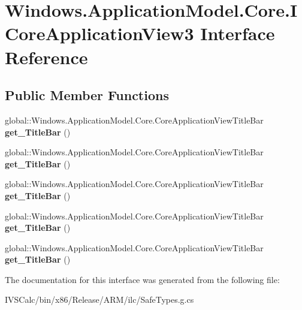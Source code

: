 \hypertarget{interface_windows_1_1_application_model_1_1_core_1_1_i_core_application_view3}{}\section{Windows.\+Application\+Model.\+Core.\+I\+Core\+Application\+View3 Interface Reference}
\label{interface_windows_1_1_application_model_1_1_core_1_1_i_core_application_view3}
\subsection*{Public Member Functions}
\begin{DoxyCompactItemize}
\item 
\mbox{\label{interface_windows_1_1_application_model_1_1_core_1_1_i_core_application_view3_adbb5333a4da014037cde0f6090433caf}} 
global\+::\+Windows.\+Application\+Model.\+Core.\+Core\+Application\+View\+Title\+Bar {\bfseries get\+\_\+\+Title\+Bar} ()
\item 
\mbox{\label{interface_windows_1_1_application_model_1_1_core_1_1_i_core_application_view3_adbb5333a4da014037cde0f6090433caf}} 
global\+::\+Windows.\+Application\+Model.\+Core.\+Core\+Application\+View\+Title\+Bar {\bfseries get\+\_\+\+Title\+Bar} ()
\item 
\mbox{\label{interface_windows_1_1_application_model_1_1_core_1_1_i_core_application_view3_adbb5333a4da014037cde0f6090433caf}} 
global\+::\+Windows.\+Application\+Model.\+Core.\+Core\+Application\+View\+Title\+Bar {\bfseries get\+\_\+\+Title\+Bar} ()
\item 
\mbox{\label{interface_windows_1_1_application_model_1_1_core_1_1_i_core_application_view3_adbb5333a4da014037cde0f6090433caf}} 
global\+::\+Windows.\+Application\+Model.\+Core.\+Core\+Application\+View\+Title\+Bar {\bfseries get\+\_\+\+Title\+Bar} ()
\item 
\mbox{\label{interface_windows_1_1_application_model_1_1_core_1_1_i_core_application_view3_adbb5333a4da014037cde0f6090433caf}} 
global\+::\+Windows.\+Application\+Model.\+Core.\+Core\+Application\+View\+Title\+Bar {\bfseries get\+\_\+\+Title\+Bar} ()
\end{DoxyCompactItemize}


The documentation for this interface was generated from the following file\+:\begin{DoxyCompactItemize}
\item 
I\+V\+S\+Calc/bin/x86/\+Release/\+A\+R\+M/ilc/Safe\+Types.\+g.\+cs\end{DoxyCompactItemize}
